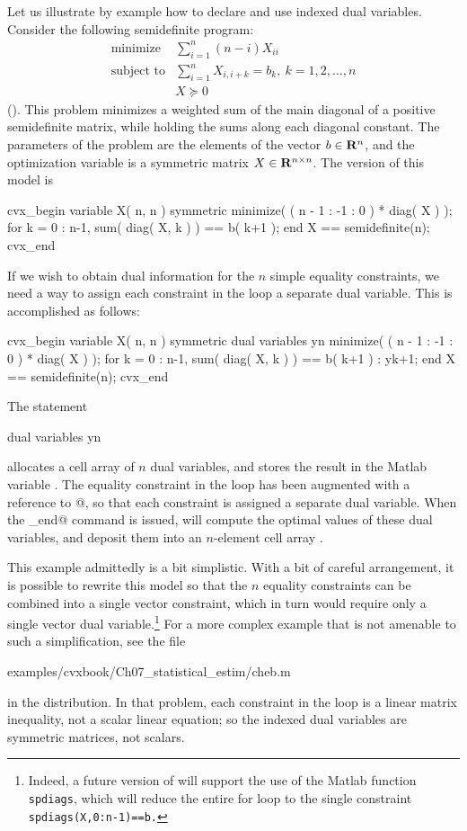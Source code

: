 \documentclass[12pt]{article}
\begin{document}
Let us illustrate by example how to declare and use indexed dual
variables. Consider the following semidefinite program:
\begin{equation}
	\begin{array}{ll}
		\text{minimize}   & \sum_{i=1}^n (n-i) X_{ii} \\
		\text{subject to} & \sum_{i=1}^n X_{i,i+k} = b_k, ~ k = 1,2,\dots,n \\
				  & X \succeq 0
	\end{array}
\end{equation}
(\cite{Stu:99}). This problem minimizes a weighted sum of the main diagonal
of a positive semidefinite matrix, while holding the sums along each diagonal
constant. The parameters of the problem are
the elements of the vector $b\in\mathbf{R}^{n}$, and the optimization variable is a
symmetric matrix $X\in\mathbf{R}^{{n}\times{n}}$. The \cvx version of this model is
\begin{code}
	cvx_begin
	    variable X( n, n ) symmetric
	    minimize( ( n - 1 : -1 : 0 ) * diag( X ) );
	    for k = 0 : n-1,
	        sum( diag( X, k ) ) == b( k+1 );
	    end
	    X == semidefinite(n);
	cvx_end
\end{code}
If we wish to obtain dual information for the $n$ simple equality constraints,
we need a way to assign each constraint in the \verb@for@ loop a separate dual variable.
This is accomplished as follows:
\begin{code}
	cvx_begin
	    variable X( n, n ) symmetric
	    dual variables y{n}
	    minimize( ( n - 1 : -1 : 0 ) * diag( X ) );
	    for k = 0 : n-1,
	        sum( diag( X, k ) ) == b( k+1 ) : y{k+1};
	    end
	    X == semidefinite(n);
	cvx_end
\end{code}
The statement
\begin{code}
	dual variables y{n}
\end{code}
allocates a cell array of $n$ dual variables, and stores the result in the Matlab
variable \verb@Z@. The equality constraint in the \verb@for@ loop has been augmented
with a reference to @, so that each constraint is assigned a separate
dual variable.
When the \verb@cvx_end@ command is issued, \cvx will compute the optimal values
of these dual variables, and deposit them into an $n$-element cell array \verb@y@.

This example admittedly is a bit simplistic. With a bit of careful arrangement,
it is possible to rewrite this model so that the $n$ equality constraints can be
combined into a single vector constraint, which in turn would require only a single
vector dual variable.\footnote{Indeed, a future version of \cvx will support the
use of the Matlab function \texttt{spdiags}, which will reduce the entire for loop
to the single constraint \texttt{spdiags(X,0:n-1)==b.}} For a more complex example
that is not amenable to such a simplification, see the file
\begin{code}
	examples/cvxbook/Ch07_statistical_estim/cheb.m
\end{code}
in the \cvx distribution.
In that problem, each constraint in the \verb@for@ loop is a linear matrix
inequality, not a scalar linear equation;
so the indexed dual variables are symmetric matrices, not scalars.
\end{document}
